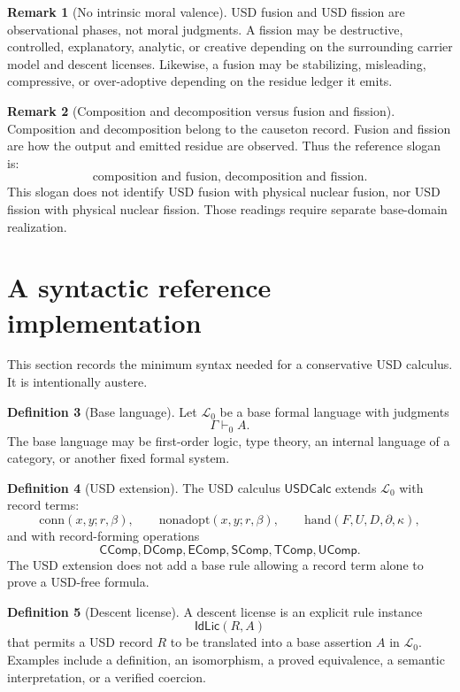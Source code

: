\documentclass[11pt]{article}
\newcommand{\IdLic}{\mathsf{IdLic}}
\newcommand{\CComp}{\mathsf{CComp}}
\newcommand{\DComp}{\mathsf{DComp}}
\newcommand{\EComp}{\mathsf{EComp}}
\newcommand{\SComp}{\mathsf{SComp}}
\newcommand{\TComp}{\mathsf{TComp}}
\newcommand{\UComp}{\mathsf{UComp}}
\newcommand{\USDCalc}{\mathsf{USDCalc}}
\theoremstyle{definition}
\newtheorem{definition}{Definition}[section]
\newtheorem{remark}[definition]{Remark}
\theoremstyle{plain}
\begin{document}
\begin{remark}[No intrinsic moral valence]
USD fusion and USD fission are observational phases, not moral judgments.
A fission may be destructive, controlled, explanatory, analytic, or
creative depending on the surrounding carrier model and descent licenses.
Likewise, a fusion may be stabilizing, misleading, compressive, or
over-adoptive depending on the residue ledger it emits.
\end{remark}

\begin{remark}[Composition and decomposition versus fusion and fission]
Composition and decomposition belong to the causeton record.  Fusion and
fission are how the output and emitted residue are observed.  Thus the
reference slogan is:
\[
  \text{composition and fusion, decomposition and fission}.
\]
This slogan does not identify USD fusion with physical nuclear fusion, nor
USD fission with physical nuclear fission.  Those readings require
separate base-domain realization.
\end{remark}

\section{A syntactic reference implementation}

This section records the minimum syntax needed for a conservative USD
calculus.  It is intentionally austere.

\begin{definition}[Base language]
Let $\mathcal L_0$ be a base formal language with judgments
\[
  \Gamma\vdash_0 A.
\]
The base language may be first-order logic, type theory, an internal
language of a category, or another fixed formal system.
\end{definition}

\begin{definition}[USD extension]
The USD calculus $\USDCalc$ extends $\mathcal L_0$ with record terms:
\[
  \mathrm{conn}(x,y;r,\beta),
  \qquad
  \mathrm{nonadopt}(x,y;r,\beta),
  \qquad
  \mathrm{hand}(F,U,D,\partial,\kappa),
\]
and with record-forming operations
\[
  \CComp,
  \DComp,
  \EComp,
  \SComp,
  \TComp,
  \UComp.
\]
The USD extension does not add a base rule allowing a record term alone to
prove a USD-free formula.
\end{definition}

\begin{definition}[Descent license]
A descent license is an explicit rule instance
\[
  \IdLic(R,A)
\]
that permits a USD record $R$ to be translated into a base assertion $A$
in $\mathcal L_0$.  Examples include a definition, an isomorphism, a
proved equivalence, a semantic interpretation, or a verified coercion.
\end{definition}
\end{document}
